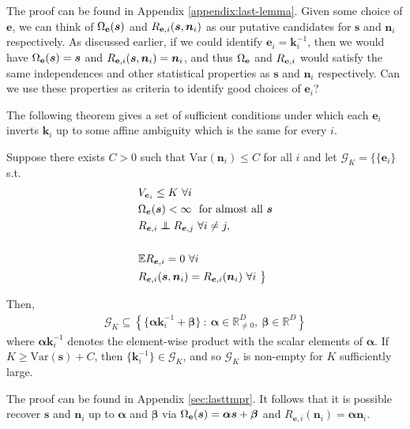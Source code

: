 The proof can be found in Appendix \ref{appendix:last-lemma}.
Given some choice of $\bm{e}$, we can think of $\Omega_{\mathbf{e}}(\bm{s})$ and $R_{\mathbf{e}, i}(\bm{s}, \bm{n}_i)$ as our putative candidates for $\bm{s}$ and $\bm{n}_i$ respectively.
As discussed earlier, if we could identify $\bm{e}_i=\bm{k}_i^{-1}$, then we would have $\Omega_{\mathbf{e}}(\bm{s}) = \bm{s}$ and $R_{\mathbf{e}, i}(\bm{s}, \bm{n}_i) = \bm{n}_i$, and thus $\Omega_{\mathbf{e}}$ and $R_{\mathbf{e}, i}$ would satisfy the same independences and other statistical properties as $\bm{s}$ and $\bm{n}_i$ respectively.
Can we use these properties as criteria to identify good choices of $\bm{e}_i$?

The following theorem gives a set of sufficient conditions under which each $\bm{e}_i$ inverts $\bm{k}_i$ up to some affine ambiguity which is the same for every $i$.

\medskip

\begin{theorem}
	\label{thm:lastthm}
	Suppose there exists $C>0$ such that $\text{Var}(\bm{n}_i) \leq C$ for all $i$ and let $\mathcal{G}_K = \big\lbrace
	\{\bm{e}_i \}$ s.t.
	\begin{align}
	& V_{\bm{e}_i} \leq K \ \forall i \label{eq:resid_1}\\
	& \Omega_{\bm{e}}(\bm{s}) < \infty \  \text{ for almost all } \bm{s} \label{eq:resid_2}\\
	&R_{\bm{e}, i} \independent R_{\bm{e}, j} \ \forall i \not= j, \label{eq:resid_3}\\
	\\    &\mathbb{E} R_{\bm{e}, i} = 0 \ \forall i \label{eq:resid_5} \\
	&R_{\bm{e}, i}(\bm{s}, \bm{n}_i) = R_{\bm{e}, i}(\bm{n}_i) \ \forall i \ \big\rbrace \label{eq:resid_6}
	\end{align}
	
	Then,
	\begin{align*}
	\mathcal{G}_K \subseteq\left\lbrace \{ \bm{\alpha} \bm{k}^{-1}_i + \bm{\beta} \} \ : \ \bm{\alpha} \in \mathbb{R}^{D}_{\not=0}, \: \bm{\beta} \in \mathbb{R}^{D} \right\rbrace
	\end{align*}
	where $\bm\alpha \bm{k}^{-1}_i$ denotes the element-wise product with the scalar elements of $\bm{\alpha}$.
	If $K \geq \text{Var}(\bm{s}) + C$, then $ \{ \bm{k}^{-1}_i \}  \in \mathcal{G}_K$,
	and so $\mathcal{G}_K$ is non-empty for $K$ sufficiently large.
\end{theorem}
The proof can be found in Appendix \ref{sec:lasttmpr}.
It follows that it is possible recover $\bm{s}$ and $\bm{n}_i$ up to $\bm{\alpha}$ and $\bm{\beta}$ via $\Omega_{\mathbf{e}}(\bm{s}) = \bm{\alpha}\bm{s} + \bm{\beta}$ and $R_{\bm{e}, i}(\bm{n}_i) = \bm{\alpha}\bm{n}_i$.

